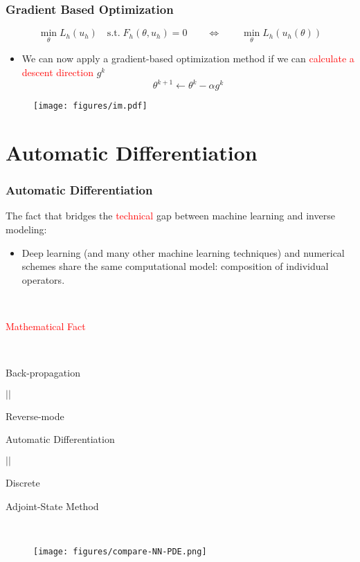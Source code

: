 \documentclass[usenames,dvipsnames]{beamer}
\begin{document}
\begin{frame}
	\frametitle{Gradient Based Optimization}
	\begin{equation*}
		\min_{\theta} L_h(u_h) \quad \mathrm{s.t.}\; F_h(\theta, u_h) = 0 \qquad\Leftrightarrow\qquad \min_{\theta} L_h({u_h(\theta)})
		\end{equation*}
	\vspace{-0.5cm}
	\begin{itemize}
		 \item We can now apply a gradient-based optimization method if we can \textcolor{red}{calculate a descent direction} $g^k$
		$$\theta^{k+1} \gets \theta^k - \alpha g^k$$ 
	\end{itemize}

	\begin{figure}[hbt]
	\centering
  \texttt{[image: figures/im.pdf]}
\end{figure}

\end{frame}



\section{Automatic Differentiation}


\begin{frame}
	\frametitle{Automatic Differentiation}
	The fact that bridges the \textcolor{red}{technical} gap between machine learning and inverse modeling:
	\begin{itemize}
		\item Deep learning (and many other machine learning techniques) and numerical schemes share the same computational model: composition of individual operators. 
	\end{itemize}
	
	
	\begin{minipage}[t]{0.4\textwidth}
		
		\
		
		
		
		\begin{center}
			\textcolor{red}{Mathematical Fact}
			
			\
			
			Back-propagation 
			
			$||$
			
			Reverse-mode
			
			Automatic Differentiation 
			
			$||$
			
			Discrete 
			
			Adjoint-State Method
		\end{center}
	\end{minipage}~
	\begin{minipage}[t]{0.6\textwidth}
		\begin{figure}[hbt]
			\texttt{[image: figures/compare-NN-PDE.png]}
		\end{figure}
	\end{minipage}
	
\end{frame}
\end{document}
